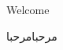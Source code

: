 \documentclass{article}
\begin{document}
Welcome
\begin {RLtext}
مرحبامرحبا
\end {RLtext}
\end{document}
